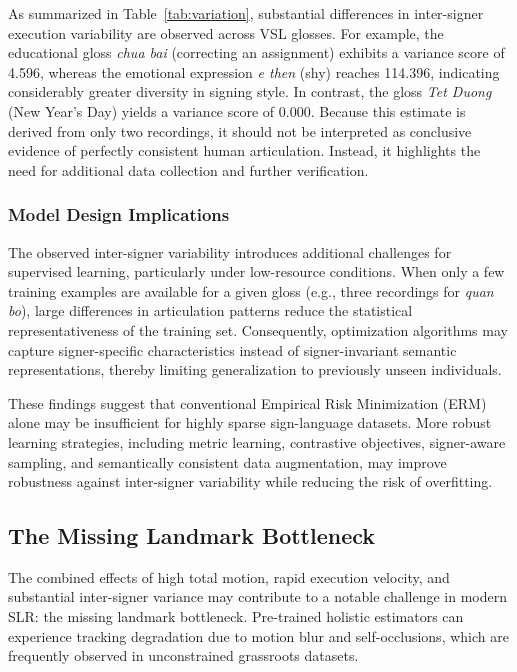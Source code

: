 \documentclass{ieeeaccess}
\begin{document}
As summarized in Table~\ref{tab:variation}, substantial differences in inter-signer execution variability are observed across VSL glosses. For example, the educational gloss \emph{chua bai} (correcting an assignment) exhibits a variance score of 4.596, whereas the emotional expression \emph{e then} (shy) reaches 114.396, indicating considerably greater diversity in signing style. In contrast, the gloss \emph{Tet Duong} (New Year's Day) yields a variance score of 0.000. Because this estimate is derived from only two recordings, it should not be interpreted as conclusive evidence of perfectly consistent human articulation. Instead, it highlights the need for additional data collection and further verification.

\subsubsection{Model Design Implications}

The observed inter-signer variability introduces additional challenges for supervised learning, particularly under low-resource conditions. When only a few training examples are available for a given gloss (e.g., three recordings for \emph{quan bo}), large differences in articulation patterns reduce the statistical representativeness of the training set. Consequently, optimization algorithms may capture signer-specific characteristics instead of signer-invariant semantic representations, thereby limiting generalization to previously unseen individuals.

These findings suggest that conventional Empirical Risk Minimization (ERM) alone may be insufficient for highly sparse sign-language datasets. More robust learning strategies, including metric learning, contrastive objectives, signer-aware sampling, and semantically consistent data augmentation, may improve robustness against inter-signer variability while reducing the risk of overfitting.

\subsection{The Missing Landmark Bottleneck}
\label{sec:missing_landmarks}

The combined effects of high total motion, rapid execution velocity, and substantial inter-signer variance may contribute to a notable challenge in modern SLR: the missing landmark bottleneck. Pre-trained holistic estimators can experience tracking degradation due to motion blur and self-occlusions, which are frequently observed in unconstrained grassroots datasets.
\end{document}
